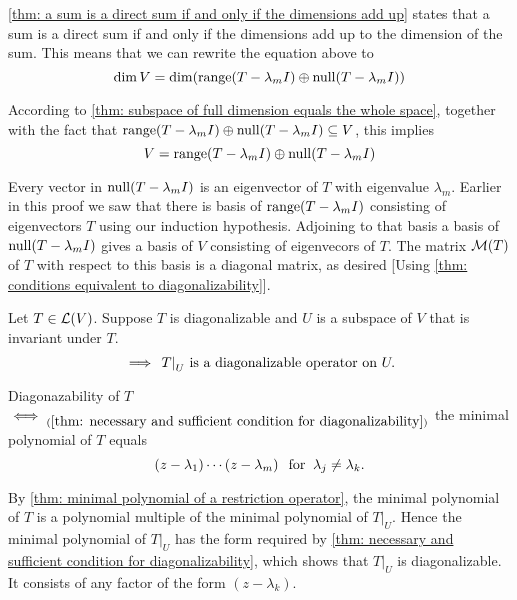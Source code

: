\begin{prf}
  \ref{thm: a sum is a direct sum if and only if the dimensions add up} states that a sum is a direct sum if and only if the dimensions add up to the dimension of the sum. This means that we can rewrite the equation above to
  \begin{equation}
    \dim V = \dim (\operatorname{range} (T-\lambda_m I) \oplus \operatorname{null} (T-\lambda_m I))
  \end{equation}

  According to \ref{thm: subspace of full dimension equals the whole space}, together with the fact that $\operatorname{range} (T-\lambda_m I) \oplus \operatorname{null} (T-\lambda_m I) \subseteq V$, this implies
  \begin{equation}
    V=\operatorname{range}(T-\lambda_m I) \oplus \operatorname{null} (T-\lambda_m I)
  \end{equation}

  Every vector in $\operatorname{null} (T-\lambda_m I)$ is an eigenvector of $T$ with eigenvalue $\lambda_m$. Earlier in this proof we saw that there is basis of $\operatorname{range}(T-\lambda_mI)$ consisting of eigenvectors $T$ using our induction hypothesis. Adjoining to that basis a basis of $\operatorname{null}(T-\lambda_mI)$ gives a basis of $V$ consisting of eigenvecors of $T$. The matrix $\mathcal{M}(T)$ of $T$ with respect to this basis is a diagonal matrix, as desired [Using \ref{thm: conditions equivalent to diagonalizability}].
\end{prf}

\setcounter{thm}{64}
\begin{thm}
  \label{thm: restriction of diagonalizable operator to invariant subspace}
  Let $T\in \mathcal{L}(V)$. Suppose $T$ is diagonalizable and $U$ is a subspace of $V$ that is invariant under $T$.
  \begin{equation}
    \implies$ $\left.T\right|_U$ is a diagonalizable operator on $U.
  \end{equation}
\end{thm}
\begin{prf}
  Diagonazability of $T$ $\iff_{(\ref{thm: necessary and sufficient condition for diagonalizability})}$ the minimal polynomial of $T$ equals
  \begin{equation}
    (z-\lambda_1)\cdots(z-\lambda_m) \;\;\, \text{for}\;\; \lambda_j \neq  \lambda_k.
  \end{equation}

  By \ref{thm: minimal polynomial of a restriction operator}, the minimal polynomial of $T$ is a polynomial multiple of the minimal polynomial of $\left.T\right|_U$.
  Hence the minimal polynomial of $\left.T\right|_U$  has the form required by \ref{thm: necessary and sufficient condition for diagonalizability}, which shows that $\left.T\right|_U$ is diagonalizable. It consists of any factor of the form $(z-\lambda_k)$.
\end{prf}



